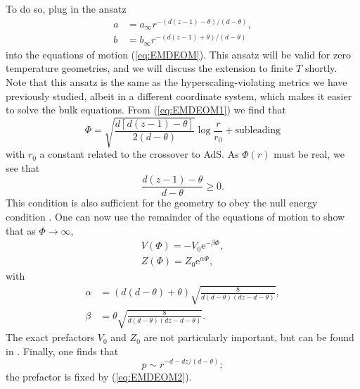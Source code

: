 \documentclass[10pt, oneside]{book}
\begin{document}
\begin{doublespace}
    To do so, plug in the ansatz \begin{subequations}\label{eq:EMDmetric42}\begin{align}
a &=a_\infty r^{-(d(z-1)-\theta)/(d-\theta)}, \\
b &= b_\infty r^{-(d(z-1)+\theta)/(d-\theta)} 
\end{align}\end{subequations}
into the equations of motion (\ref{eq:EMDEOM}).   This ansatz will be valid for zero temperature geometries, and we will discuss the extension to finite $T$ shortly.   Note that this ansatz is the same as the hyperscaling-violating metrics we have previously studied, albeit in a different coordinate system,  which makes it easier to solve the bulk equations.   From (\ref{eq:EMDEOM1}) we find that \begin{equation}
\Phi = \sqrt{\frac{d[d(z-1)-\theta]}{2(d-\theta)}}\log\frac{r}{r_0} + \text{subleading}
\end{equation}
with $r_0$ a constant related to the crossover to AdS.   As $\Phi(r)$ must be real, we see that \begin{equation}
\frac{d(z-1)-\theta}{d-\theta}\ge 0.
\end{equation}
This condition is also sufficient for the geometry to obey the null energy condition \cite{Huijse:2011ef}.  One can now use the remainder of the equations of motion to show that  as $\Phi\rightarrow \infty$,\begin{subequations}\begin{align}
V(\Phi) = -V_0 \mathrm{e}^{-\beta\Phi}, \\
Z(\Phi) = Z_0 \mathrm{e}^{\alpha \Phi},
\end{align}\end{subequations}
with \begin{subequations}\begin{align}
\alpha &= (d(d-\theta)+\theta)\sqrt{\frac{8}{d(d-\theta)(dz-d-\theta)}}, \\
\beta &= \theta\sqrt{\frac{8}{d(d-\theta)(dz-d-\theta)}}.
\end{align}\end{subequations}
The exact prefactors $V_0$ and $Z_0$ are not particularly important, but can be found in \cite{Huijse:2011ef, Lucas:2014sba}.   Finally, one finds that \begin{equation}
p \sim r^{-d-dz/(d-\theta)};  \label{eq:pEMD}
\end{equation}
the prefactor is fixed by (\ref{eq:EMDEOM2}).


\end{doublespace}
\end{document}
